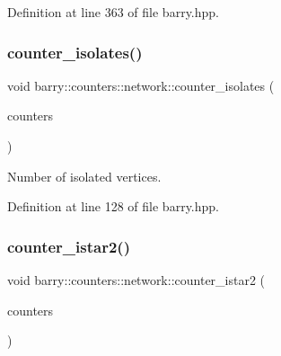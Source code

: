 Definition at line 363 of file barry.\+hpp.

\mbox{\label{namespacebarry_1_1counters_1_1network_abb12a5ddff5be1b860139a1a9bc3ff87}} 
\subsubsection{\texorpdfstring{counter\+\_\+isolates()}{counter\_isolates()}}
{\footnotesize\ttfamily void barry\+::counters\+::network\+::counter\+\_\+isolates (\begin{DoxyParamCaption}\item[{\hyperlink{namespacebarry_1_1counters_1_1network_aa72fdb34752ac24167a06ee196a8fff6}{Net\+Counters} $\ast$}]{counters }\end{DoxyParamCaption})\hspace{0.3cm}{\ttfamily [inline]}}



Number of isolated vertices. 



Definition at line 128 of file barry.\+hpp.

\mbox{\label{namespacebarry_1_1counters_1_1network_ac1cf7a400dacb5fd40750ba4a0c00e81}} 
\subsubsection{\texorpdfstring{counter\+\_\+istar2()}{counter\_istar2()}}
{\footnotesize\ttfamily void barry\+::counters\+::network\+::counter\+\_\+istar2 (\begin{DoxyParamCaption}\item[{\hyperlink{namespacebarry_1_1counters_1_1network_aa72fdb34752ac24167a06ee196a8fff6}{Net\+Counters} $\ast$}]{counters }\end{DoxyParamCaption})\hspace{0.3cm}{\ttfamily [inline]}}



